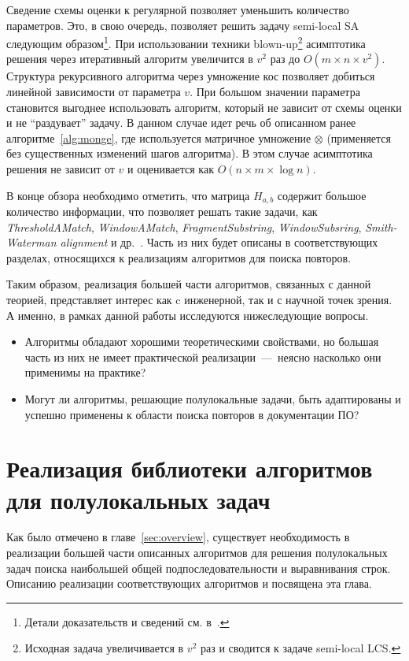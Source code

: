 Сведение схемы оценки к регулярной позволяет уменьшить количество параметров.
Это, в свою очередь, позволяет решить задачу semi-local SA следующим образом\footnote{Детали доказательств и сведений см. в~\cite{tiskin2006all}.}. 
При использовании техники blown-up\footnote{Исходная задача увеличивается в $v^2$ раз и сводится к задаче semi-local LCS.} асимптотика решения через итеративный алгоритм увеличится в $v^2$ раз до $O(m \times n \times v^2)$.
Структура рекурсивного алгоритма через умножение кос позволяет добиться линейной зависимости от параметра $v$. 
При большом значении параметра становится выгоднее использовать алгоритм, который не зависит от схемы оценки и не ``раздувает'' задачу. 
В данном случае идет речь об описанном ранее алгоритме~\ref{alg:monge}, где используется матричное умножение $\otimes$ (применяется без существенных изменений шагов алгоритма).
В этом случае асимптотика решения не зависит от $v$ и оценивается как $O(n \times m \times \log n)$.

В конце обзора необходимо отметить, что матрица $H_{a,b}$ содержит большое количество информации, что позволяет решать такие задачи, как \emph{ThresholdAMatch}, \emph{WindowAMatch}, \emph{FragmentSubstring}, \emph{WindowSubsring}, \emph{Smith-Waterman alignment} и др.~\cite{tiskin2006all}. 
Часть из них будет описаны в соответствующих разделах, относящихся к реализациям алгоритмов для поиска повторов.

Таким образом, реализация большей части алгоритмов, связанных с данной теорией, представляет интерес как c инженерной, так и с научной точек зрения.
А именно, в рамках данной работы исследуются нижеследующие вопросы.
\begin{itemize}
\item Алгоритмы обладают хорошими теоретическими свойствами, но большая часть из них не имеет практической реализации~---~неясно насколько они применимы на практике?
\item Могут ли алгоритмы, решающие полулокальные задачи, быть адаптированы и успешно применены к области поиска повторов в документации ПО?
\end{itemize}



\section{Реализация библиотеки алгоритмов для полулокальных задач}\label{librarySection}
Как было отмечено %
в главе~\ref{sec:overview},
существует необходимость в реализации большей части описанных алгоритмов для решения полулокальных задач поиска наибольшей общей подпоследовательности и выравнивания строк.
Описанию реализации соответствующих алгоритмов и посвящена эта глава.


